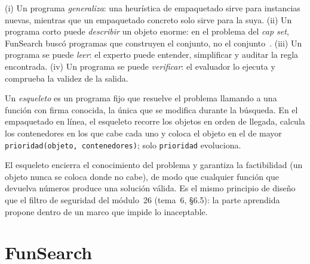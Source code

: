 \begin{observacion}\label{obs:por-que-programas}
(i) Un programa \emph{generaliza}: una heurística de empaquetado sirve para instancias nuevas, mientras que un empaquetado concreto solo sirve para la suya. (ii) Un programa corto puede \emph{describir} un objeto enorme: en el problema del \emph{cap set}, FunSearch buscó programas que construyen el conjunto, no el conjunto~\cite{funsearch}. (iii) Un programa se puede \emph{leer}: el experto puede entender, simplificar y auditar la regla encontrada. (iv) Un programa se puede \emph{verificar}: el evaluador lo ejecuta y comprueba la validez de la salida.
\end{observacion}

\begin{definicion}\label{def:esqueleto}
Un \emph{esqueleto} es un programa fijo que resuelve el problema llamando a una función con firma conocida, la única que se modifica durante la búsqueda. En el empaquetado en línea, el esqueleto recorre los objetos en orden de llegada, calcula los contenedores en los que cabe cada uno y coloca el objeto en el de mayor \texttt{prioridad(objeto, contenedores)}; solo \texttt{prioridad} evoluciona.
\end{definicion}

El esqueleto encierra el conocimiento del problema y garantiza la factibilidad (un objeto nunca se coloca donde no cabe), de modo que cualquier función que devuelva números produce una solución válida. Es el mismo principio de diseño que el filtro de seguridad del módulo~26 (tema~6, §6.5): la parte aprendida propone dentro de un marco que impide lo inaceptable.

\section{FunSearch}

